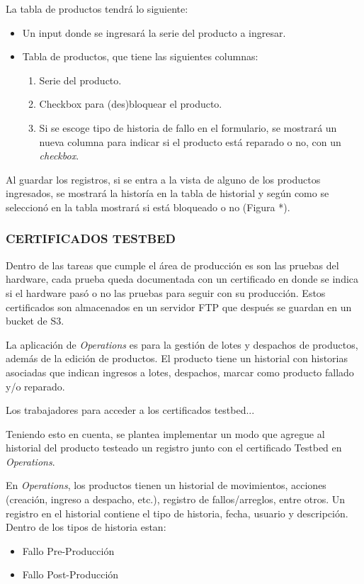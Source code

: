 La tabla de productos tendrá lo siguiente:

\begin{itemize}
    \item Un input donde se ingresará la serie del producto a ingresar.
    \item Tabla de productos, que tiene las siguientes columnas:
    \begin{enumerate}
        \item Serie del producto.
        \item Checkbox para (des)bloquear el producto.
        \item Si se escoge tipo de historia de fallo en el formulario, se mostrará un nueva columna para indicar si el producto está reparado o no, con un \textit{checkbox}.
    \end{enumerate}    
\end{itemize}

Al guardar los registros, si se entra a la vista de alguno de los productos ingresados, se mostrará la historía en la tabla de historial y según como se seleccionó en la tabla mostrará si está bloqueado o no (Figura *).
\iffalse
\subsubsection{CERTIFICADOS TESTBED}

Dentro de las tareas que cumple el área de producción es son las pruebas del hardware, cada prueba queda documentada con
un certificado en donde se indica si el hardware pasó o no las pruebas para seguir con su producción. Estos certificados son
almacenados en un servidor FTP que después se guardan en un bucket de S3.

La aplicación de \textit{Operations} es para la gestión de lotes y despachos de productos, además de la edición de productos.
El producto tiene un historial con historias asociadas que indican ingresos a lotes, despachos, marcar como producto fallado y/o reparado.

Los trabajadores para acceder a los certificados testbed...

Teniendo esto en cuenta, se plantea implementar un modo que agregue al historial del producto testeado un registro junto con el certificado Testbed en \textit{Operations}.

En \textit{Operations}, los productos tienen un historial de movimientos, acciones (creación, ingreso a despacho, etc.), registro de fallos/arreglos, entre otros.
Un registro en el historial contiene el tipo de historia, fecha, usuario y descripción. Dentro de los tipos de historia estan:
\begin{itemize}
    \item Fallo Pre-Producción
    \item Fallo Post-Producción
\end{itemize}

